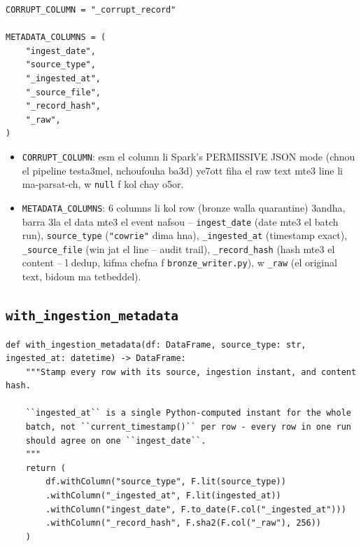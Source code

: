 \documentclass[11pt,a4paper]{report}
\DeclareRobustCommand{\code}[1]{\texttt{#1}}
\begin{document}
\begin{lstlisting}[style=pystyle]
CORRUPT_COLUMN = "_corrupt_record"

METADATA_COLUMNS = (
    "ingest_date",
    "source_type",
    "_ingested_at",
    "_source_file",
    "_record_hash",
    "_raw",
)
\end{lstlisting}

\begin{itemize}
  \item \code{CORRUPT\_COLUMN}: esm el column li Spark's PERMISSIVE JSON
        mode (chnou el pipeline testa3mel, nchoufouha ba3d) ye7ott fiha
        el raw text mte3 line li ma-parsat-ch, w \code{null} f kol chay
        o5or.
  \item \code{METADATA\_COLUMNS}: 6 columns li kol row (bronze walla
        quarantine) 3andha, barra 3la el data mte3 el event nafsou --
        \code{ingest\_date} (date mte3 el batch run), \code{source\_type}
        (\code{"cowrie"} dima hna), \code{\_ingested\_at} (timestamp exact),
        \code{\_source\_file} (win jat el line -- audit trail), \code{\_record\_hash}
        (hash mte3 el content -- l dedup, kifma chefna f \code{bronze\_writer.py}),
        w \code{\_raw} (el original text, bidoun ma tetbeddel).
\end{itemize}

\subsection{\code{with\_ingestion\_metadata}}

\begin{lstlisting}[style=pystyle]
def with_ingestion_metadata(df: DataFrame, source_type: str, ingested_at: datetime) -> DataFrame:
    """Stamp every row with its source, ingestion instant, and content hash.

    ``ingested_at`` is a single Python-computed instant for the whole
    batch, not ``current_timestamp()`` per row - every row in one run
    should agree on one ``ingest_date``.
    """
    return (
        df.withColumn("source_type", F.lit(source_type))
        .withColumn("_ingested_at", F.lit(ingested_at))
        .withColumn("ingest_date", F.to_date(F.col("_ingested_at")))
        .withColumn("_record_hash", F.sha2(F.col("_raw"), 256))
    )
\end{lstlisting}
\end{document}
